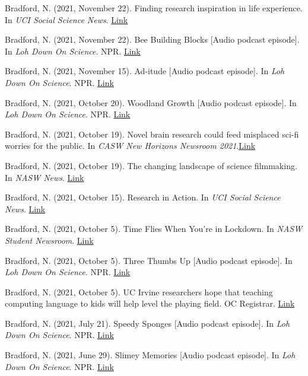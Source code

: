\documentclass[margin, 10pt]{res} %
\begin{document}
\begin{resume}
Bradford, N. (2021, November 22). Finding research inspiration in life experience. In {\sl UCI Social Science News}. \href{https://www.socsci.uci.edu/newsevents/news/2021/2021-11-22-zeinab-kachakeche.php}{Link}

Bradford, N. (2021, November 22). Bee Building Blocks [Audio podcast episode]. In {\sl Loh Down On Science}. NPR. \href{https://lohdownonscience.com/bee-building-blocks/}{Link}

Bradford, N. (2021, November 15). Ad-itude [Audio podcast episode]. In {\sl Loh Down On Science}. NPR. \href{https://lohdownonscience.com/ad-itude/}{Link}

Bradford, N. (2021, October 20). Woodland Growth [Audio podcast episode]. In {\sl Loh Down On Science}. NPR. \href{https://lohdownonscience.com/woodland-growth/}{Link}

Bradford, N. (2021, October 19). Novel brain research could feed misplaced sci-fi worries for the public. In {\sl CASW New Horizons Newsroom 2021}.\href{https://casw.org/news/novel-brain-research-could-feed-misplaced-sci-fi-worries-for-the-public/}{Link} 

Bradford, N. (2021, October 19). The changing landscape of science filmmaking. In {\sl NASW News}. \href{https://www.nasw.org/article/changing-landscape-science-filmmaking}{Link} 

Bradford, N. (2021, October 15). Research in Action. In {\sl UCI Social Science News}. \href{https://www.socsci.uci.edu/newsevents/news/2021/2021-10-15-gillooly.php}{Link} 

Bradford, N. (2021, October 5). Time Flies When You're in Lockdown. In {\sl NASW Student Newsroom}. \href{https://nasw.org/article/time-flies-when-youre-lockdown}{Link}

Bradford, N. (2021, October 5). Three Thumbs Up [Audio podcast episode]. In {\sl Loh Down On Science}. NPR. \href{https://lohdownonscience.com/three-thumbs-up/}{Link}

Bradford, N. (2021, October 5). UC Irvine researchers hope that teaching computing language to kids will help level the playing field. OC Registrar. \href{https://www.ocregister.com/2021/10/05/uc-irvine-researchers-hope-that-teaching-computing-language-to-kids-will-help-level-the-playing-field/}{Link}

Bradford, N. (2021, July 21). Speedy Sponges [Audio podcast episode]. In {\sl Loh Down On Science}. NPR. \href{https://lohdownonscience.com/speedy-sponges/}{Link}

Bradford, N. (2021, June 29). Slimey Memories [Audio podcast episode]. In {\sl Loh Down On Science}. NPR. \href{https://lohdownonscience.com/slimey-memories/}{Link}


\end{resume}
\end{document}
